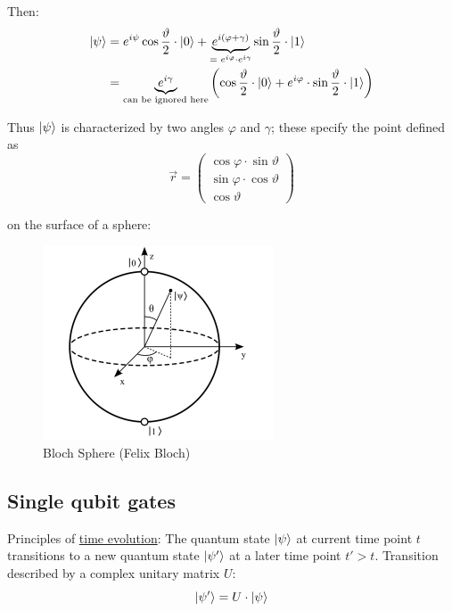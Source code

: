 Then:
\begin{align}
    \lvert\psi\rangle &= 
        e^{i \psi} \cos{\frac{\vartheta}{2}} \cdot \lvert0\rangle 
        + \underbrace{e^{i (\varphi + \gamma)}}_{= \text{ } e^{i\varphi} \cdot e^{i\gamma}} \sin{\frac{\vartheta}{2}} \cdot \lvert1\rangle \\
        &= \underbrace{e^{i \gamma}}_{\text{can be ignored here}}
        \left(\cos{\frac{\vartheta}{2}} \cdot \lvert0\rangle + e^{i\varphi} \cdot \sin{\frac{\vartheta}{2}} \cdot \lvert1\rangle\right)
\end{align}

Thus $\lvert\psi\rangle$ is characterized by two angles $\varphi$ and $\gamma$;
these specify the point defined as 
\begin{equation*}
    \vec{r} = \begin{pmatrix}
        \cos{\varphi} \cdot \sin{\vartheta} \\
        \sin{\varphi} \cdot \cos{\vartheta} \\
        \cos{\vartheta}
    \end{pmatrix}
\end{equation*}

on the surface of a sphere:
\begin{figure}[h!]
    \centering
    \includegraphics[scale=0.5]{chapters/res/bloch-sphere.png}
    \caption{Bloch Sphere (Felix Bloch)}
\end{figure}

\subsection{Single qubit gates}

Principles of \underline{time evolution}: The quantum state $\lvert\psi\rangle$ at current
time point $t$ transitions to a new quantum state $\lvert\psi'\rangle$ at a later time point
$t' > t$. \newline
Transition described by a complex unitary matrix $U$:
\begin{equation}
    \lvert\psi'\rangle = U \cdot \lvert\psi\rangle
\end{equation}

